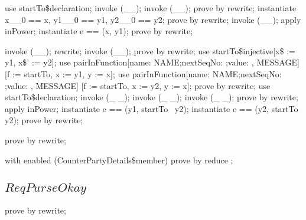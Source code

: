 \begin{LPScript}\begin{zproof}[gMESSAGEStartToPFunType]
    use startTo\$declaration;
    invoke (\_\fun \_);
    invoke (\_\pfun \_);
    prove by rewrite;
    instantiate x\_\_0 == x, y1\_\_0 == y1, y2\_\_0 == y2;
    prove by rewrite;
    invoke (\_\rel\_);
    apply inPower;
    instantiate e == (x, y1);
    prove by rewrite;
\end{zproof}\end{LPScript}

\begin{LPScript}\begin{zproof}[gMESSAGEStartToPInjType]
    invoke (\_\pinj \_);
    rewrite;
    invoke (\_\pfun \_);
    prove by rewrite;
    use startTo\$injective[x\$ := y1, x\$' := y2];
    use pairInFunction[\lblot name: NAME;nextSeqNo: \nat;value: \nat \rblot, MESSAGE]
                        [f := startTo, x := y1, y := x];
    use pairInFunction[\lblot name: NAME;nextSeqNo: \nat;value: \nat \rblot, MESSAGE]
                        [f := startTo, x := y2, y := x];
    prove by rewrite;
    use startTo\$declaration;
    invoke (\_ \fun \_);
    invoke (\_ \pfun \_);
    invoke (\_ \rel \_);
    prove by rewrite;
    apply inPower;
    instantiate e == (y1, startTo~ y2);
    instantiate e == (y2, startTo~ y2);
    prove by rewrite;
\end{zproof}\end{LPScript}

\begin{LDCheck}\begin{zproof}
   prove by rewrite;
\end{zproof}\end{LDCheck}

\begin{LDCheck}\begin{zproof}
   with enabled (CounterPartyDetails\$member) prove by reduce ;
\end{zproof}\end{LDCheck}

\subsection{$ReqPurseOkay$}

\begin{LDCheck}\begin{zproof}
   prove by rewrite;
\end{zproof}\end{LDCheck}

